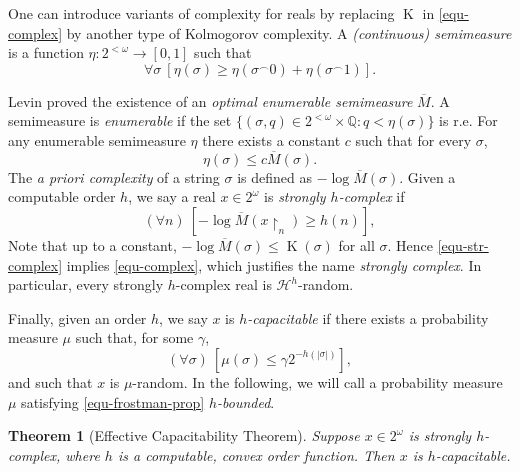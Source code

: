 \documentclass[11pt,reqno]{article}
\theoremstyle{plain}
\newtheorem{thm}{Theorem}
\theoremstyle{definition}
\theoremstyle{remark}
\numberwithin{equation}{section}
\newcommand{\Rat}{\ensuremath{\mathbb{Q}}}
\newcommand{\Cant}{\ensuremath{2^{\omega}}}
\newcommand{\Str}[1][<\omega]{\ensuremath{2^{#1}}}
\newcommand{\Rest}[1]{\ensuremath{\!\restriction_{#1}}}
\newcommand{\Conc}{\ensuremath{\mbox{}^\frown}}
\newcommand{\Hmeas}{\ensuremath{\mathcal{H}}}
\newcommand{\Hm}[1]{\ensuremath{\Hmeas^{#1}}}
\DeclareMathOperator{\K}{K}
\begin{document}
One can introduce variants of complexity for reals by replacing $\K$ in \eqref{equ-complex} by another type of Kolmogorov complexity. A \emph{(continuous) semimeasure} is a function $\eta: \Str \to [0,1]$ such that
\begin{equation} \label{equ-semimeas}
	\forall \sigma \: [ \eta(\sigma) \geq \eta(\sigma \Conc 0) + \eta(\sigma\Conc 1) ].
\end{equation}

Levin \citep{zvonkin-levin:1970} proved the existence of an \emph{optimal enumerable semimeasure} $\overline{M}$. A semimeasure is \emph{enumerable} if the set $\{(\sigma,q) \in \Str\times\Rat\colon q < \eta(\sigma)\}$ is r.e. For any enumerable semimeasure $\eta$ there exists a constant $c$ such that for every $\sigma$,
\[
	\eta(\sigma) \leq c \overline{M}(\sigma).
\]
The \emph{a priori complexity} of a string $\sigma$ is defined as $-\log \overline{M}(\sigma)$.
Given a computable order $h$, we say a real $x\in \Cant$ is \emph{strongly $h$-complex} if  
\begin{equation}\label{equ-str-complex}
	(\forall n)\: [ -\log \overline{M}(x\Rest{n}) \geq h(n)],
\end{equation}
Note that up to a constant, $-\log \overline{M}(\sigma) \leq \K(\sigma)$ for all $\sigma$. Hence \eqref{equ-str-complex} implies \eqref{equ-complex}, which justifies the name \emph{strongly complex}. In particular, every strongly $h$-complex real is $\Hm{h}$-random.

Finally, given an order $h$, we say $x$ is \emph{$h$-capacitable} if there exists a probability measure $\mu$ such that, for some $\gamma$,
\begin{equation} \label{equ-frostman-prop}
		(\forall \sigma) \: [\mu(\sigma) \leq \gamma 2^{-h(|\sigma|)}],
\end{equation}
and such that $x$ is $\mu$-random. In the following, we will call a probability measure $\mu$ satisfying \eqref{equ-frostman-prop} \emph{$h$-bounded}.

\begin{thm}[Effective Capacitability Theorem] \label{thm-eff-frostman}
	Suppose $x \in \Cant$ is strongly $h$-complex, where $h$ is a computable, convex order function. Then $x$ is $h$-capacitable.
\end{thm}
\end{document}
